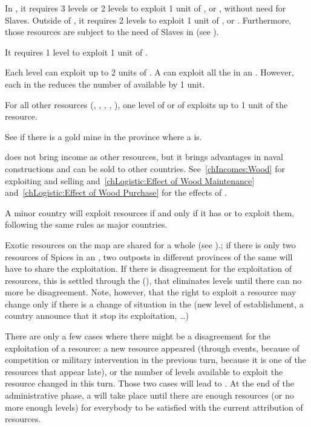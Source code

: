 \bparag In , it requires 3 \TP levels or 2 \COL levels to
exploit 1 unit of ,  or ,
without need for Slaves.
\bparag Outside of , it requires 2 \COL levels to exploit 1
unit of ,  or . Furthermore,
those resources are subject to the need of Slaves in  (see
).

\aparag[Fish.] It requires 1 \COL level to exploit 1 unit of .

\aparag[Fur.]
\bparag Each \TP level can exploit up to 2 units of .
\bparag A \COL can exploit all the  in an \Area. However, each
\COL\faceplus in the \Area reduces the number of available  by 1
unit.

 For all other resources (,
, , , ), one level of \COL or of
\TP exploits up to 1 unit of the resource.

\aparag[Gold.] See  if there is a gold mine in
the province where a \COL is.

\aparag[Wood.]  does not bring income as other resources, but
it brings advantages in naval constructions and can be sold to other
countries. See~\ref{chIncomes:Wood} for exploiting and selling
 and~\ref{chLogistic:Effect of Wood Maintenance}
and~\ref{chLogistic:Effect of Wood Purchase} for the effects of
.

\aparag A \ROTW minor country will exploit resources if and only if it has \TP
or \COL to exploit them, following the same rules as major countries.

\aparag Exotic resources on the \ROTW map are shared for a whole \Area (see
).; if there is only two resources of Spices in
an \Area, two outposts in different provinces of the same \Area will have to
share the exploitation.
\bparag If there is disagreement for the exploitation of resources, this
is settled through the 
(), that eliminates levels until
there can no more be disagreement.
\bparag Note, however, that the right to exploit a resource may change
only if there is a change of situation in the \Area (new level of
establishment, a country announce that it stop its exploitation,
\ldots)

 There are only a few cases where there might be a
disagreement for the exploitation of a resource: a new resource appeared
(through events, because of competition or military intervention in the
previous turn, because it is one of the resources that appear late), or the
number of levels available to exploit the resource changed in this turn.
\bparag Those two cases will lead to . At the end
of the administrative phase, a  will take place until there
are enough resources (or no more enough levels) for everybody to be satisfied
with the current attribution of resources.

